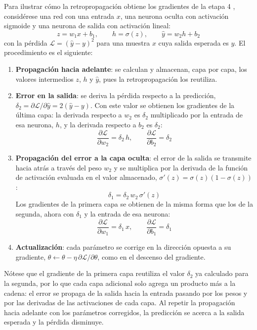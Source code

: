Para ilustrar cómo la retropropagación obtiene los gradientes de la etapa 4 \cite{rumelhart1986_backprop}, considérese una red con una entrada $x$, una neurona oculta con activación sigmoide y una neurona de salida con activación lineal:
\[
z = w_1 x + b_1, \qquad h = \sigma(z), \qquad \hat{y} = w_2 h + b_2
\]
con la pérdida $\mathcal{L} = (\hat{y} - y)^2$ para una muestra $x$ cuya salida esperada es $y$. El procedimiento es el siguiente:

\begin{enumerate}
	\item \textbf{Propagación hacia adelante}: se calculan y almacenan, capa por capa, los valores intermedios $z$, $h$ y $\hat{y}$, pues la retropropagación los reutiliza.
	\item \textbf{Error en la salida}: se deriva la pérdida respecto a la predicción, $\delta_2 = \partial \mathcal{L} / \partial \hat{y} = 2(\hat{y} - y)$. Con este valor se obtienen los gradientes de la última capa: la derivada respecto a $w_2$ es $\delta_2$ multiplicado por la entrada de esa neurona, $h$, y la derivada respecto a $b_2$ es $\delta_2$:
	\[
		\frac{\partial \mathcal{L}}{\partial w_2} = \delta_2\, h, \qquad
		\frac{\partial \mathcal{L}}{\partial b_2} = \delta_2
	\]
	\item \textbf{Propagación del error a la capa oculta}: el error de la salida se transmite hacia atrás a través del peso $w_2$ y se multiplica por la derivada de la función de activación evaluada en el valor almacenado, $\sigma'(z) = \sigma(z) (1 - \sigma(z))$:
	\[
		\delta_1 = \delta_2\, w_2\, \sigma'(z)
	\]
	Los gradientes de la primera capa se obtienen de la misma forma que los de la segunda, ahora con $\delta_1$ y la entrada de esa neurona:
	\[
		\frac{\partial \mathcal{L}}{\partial w_1} = \delta_1\, x, \qquad
		\frac{\partial \mathcal{L}}{\partial b_1} = \delta_1
	\]
	\item \textbf{Actualización}: cada parámetro se corrige en la dirección opuesta a su gradiente, $\theta \leftarrow \theta - \eta\, \partial \mathcal{L} / \partial \theta$, como en el descenso del gradiente.
\end{enumerate}

Nótese que el gradiente de la primera capa reutiliza el valor $\delta_2$ ya calculado para la segunda, por lo que cada capa adicional solo agrega un producto más a la cadena: el error se propaga de la salida hacia la entrada pasando por los pesos y por las derivadas de las activaciones de cada capa. Al repetir la propagación hacia adelante con los parámetros corregidos, la predicción se acerca a la salida esperada y la pérdida disminuye.


